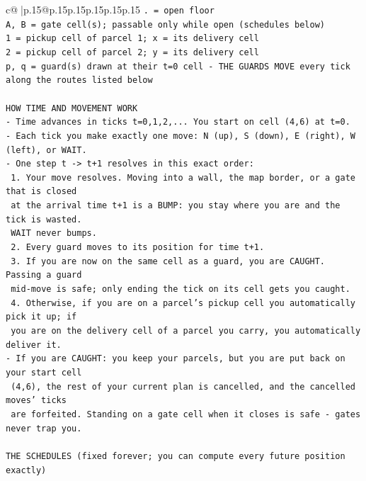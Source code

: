 \documentclass{article}
\begin{document}
{\begin{supertabular}{c@{$\;$}|p{.15\linewidth}@{}p{.15\linewidth}p{.15\linewidth}p{.15\linewidth}p{.15\linewidth}p{.15\linewidth}}
{{{\texttt{. = open floor} \\
\texttt{A, B = gate cell(s); passable only while open (schedules below)} \\
\texttt{1 = pickup cell of parcel 1; x = its delivery cell} \\
\texttt{2 = pickup cell of parcel 2; y = its delivery cell} \\
\texttt{p, q = guard(s) drawn at their t=0 cell {-} THE GUARDS MOVE every tick along the routes listed below} \\
\\ 
\texttt{HOW TIME AND MOVEMENT WORK} \\
\texttt{{-} Time advances in ticks t=0,1,2,... You start on cell (4,6) at t=0.} \\
\texttt{{-} Each tick you make exactly one move: N (up), S (down), E (right), W (left), or WAIT.} \\
\texttt{{-} One step t {-}> t+1 resolves in this exact order:} \\
\texttt{  1. Your move resolves. Moving into a wall, the map border, or a gate that is closed} \\
\texttt{     at the arrival time t+1 is a BUMP: you stay where you are and the tick is wasted.} \\
\texttt{     WAIT never bumps.} \\
\texttt{  2. Every guard moves to its position for time t+1.} \\
\texttt{  3. If you are now on the same cell as a guard, you are CAUGHT. Passing a guard} \\
\texttt{     mid{-}move is safe; only ending the tick on its cell gets you caught.} \\
\texttt{  4. Otherwise, if you are on a parcel's pickup cell you automatically pick it up; if} \\
\texttt{     you are on the delivery cell of a parcel you carry, you automatically deliver it.} \\
\texttt{{-} If you are CAUGHT: you keep your parcels, but you are put back on your start cell} \\
\texttt{  (4,6), the rest of your current plan is cancelled, and the cancelled moves' ticks} \\
\texttt{  are forfeited. Standing on a gate cell when it closes is safe {-} gates never trap you.} \\
\\ 
\texttt{THE SCHEDULES (fixed forever; you can compute every future position exactly)} \\
}}}
\end{supertabular}}
\end{document}
